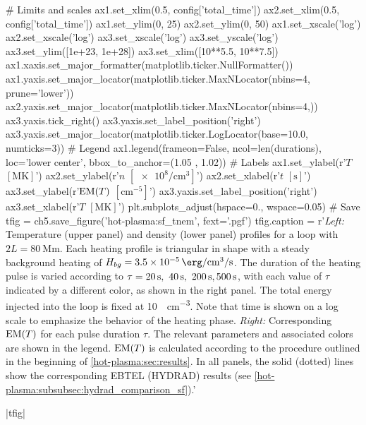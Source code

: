 \begin{pycode}[chapter5]
# Limits and scales
ax1.set_xlim(0.5, config['total_time'])
ax2.set_xlim(0.5, config['total_time'])
ax1.set_ylim(0, 25)
ax2.set_ylim(0, 50)
ax1.set_xscale('log')
ax2.set_xscale('log')
ax3.set_xscale('log')
ax3.set_yscale('log')
ax3.set_ylim([1e+23, 1e+28])
ax3.set_xlim([10**5.5, 10**7.5])
ax1.xaxis.set_major_formatter(matplotlib.ticker.NullFormatter())
ax1.yaxis.set_major_locator(matplotlib.ticker.MaxNLocator(nbins=4, prune='lower'))
ax2.yaxis.set_major_locator(matplotlib.ticker.MaxNLocator(nbins=4,))
ax3.yaxis.tick_right()
ax3.yaxis.set_label_position('right')
ax3.yaxis.set_major_locator(matplotlib.ticker.LogLocator(base=10.0, numticks=3))
# Legend
ax1.legend(frameon=False, ncol=len(durations), loc='lower center',
           bbox_to_anchor=(1.05 , 1.02))
# Labels
ax1.set_ylabel(r'$T$ $[\si{\mega\kelvin}]$')
ax2.set_ylabel(r'$n$ $[\num{e8}\si{\per\cubic\cm}]$')
ax2.set_xlabel(r'$t$ $[\si{\second}]$')
ax3.set_ylabel(r'$\textup{EM}(T)$ $[\si{\cm\tothe{-5}}]$')
ax3.yaxis.set_label_position('right')
ax3.set_xlabel(r'$T$ $[\si{\mega\kelvin}]$')
plt.subplots_adjust(hspace=0., wspace=0.05)
# Save
tfig = ch5.save_figure('hot-plasma:sf_tnem', fext='.pgf')
tfig.caption = r'\textit{Left:} Temperature (upper panel) and density (lower panel) profiles for a loop with $2L=\SI{80}{\mega\m}$. Each heating profile is triangular in shape with a steady background heating of $H_{bg}=\SI{3.5e-5}{\erg\per\cubic\cm\per\second}$. The duration of the heating pulse is varied according to $\tau=\SIlist[list-final-separator = {,}]{20;40;200;500}{\second}$, with each value of $\tau$ indicated by a different color, as shown in the right panel. The total energy injected into the loop is fixed at \SI{10}{\erg\per\cubic\cm}. Note that time is shown on a log scale to emphasize the behavior of the heating phase. \textit{Right:} Corresponding $\emd[T]$ for each pulse duration $\tau$. The relevant parameters and associated colors are shown in the legend. $\emd[T]$ is calculated according to the procedure outlined in the beginning of \autoref{hot-plasma:sec:results}. In all panels, the solid (dotted) lines show the corresponding EBTEL (HYDRAD) results (see \autoref{hot-plasma:subsubsec:hydrad_comparison_sf}).'
\end{pycode}
\py[chapter5]|tfig|

